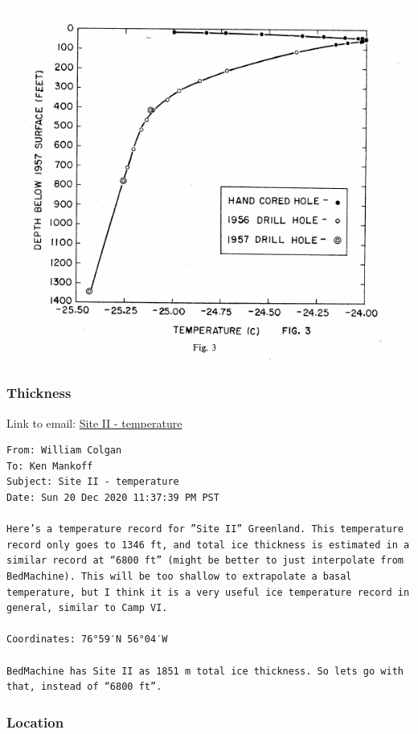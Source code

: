 \documentclass[article,a4paper,times,11pt,twoside]{article}
\begin{document}
\begin{center}
\includegraphics[width=.9\linewidth]{site_ii/hansen_1958_fig3.png}
\end{center}

\subsubsection{Thickness}
\label{sec:org504ce30}

Link to email: \href{msgid:AM0PR04MB612902A1264CB3D0BA62E550A2C00@AM0PR04MB6129.eurprd04.prod.outlook.com}{Site II - temperature}

\begin{verbatim}
From: William Colgan
To: Ken Mankoff
Subject: Site II - temperature
Date: Sun 20 Dec 2020 11:37:39 PM PST

Here’s a temperature record for ”Site II” Greenland. This temperature
record only goes to 1346 ft, and total ice thickness is estimated in a
similar record at “6800 ft” (might be better to just interpolate from
BedMachine). This will be too shallow to extrapolate a basal
temperature, but I think it is a very useful ice temperature record in
general, similar to Camp VI.

Coordinates: 76°59′N 56°04′W

BedMachine has Site II as 1851 m total ice thickness. So lets go with
that, instead of “6800 ft”.
\end{verbatim}

\subsubsection{Location}
\label{sec:org4f6425b}
\end{document}
